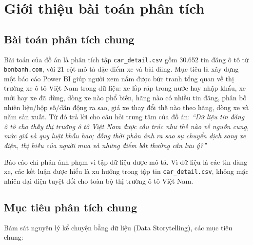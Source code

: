 \section{Giới thiệu bài toán phân tích}\label{sec:gioi-thieu}

\subsection{Bài toán phân tích chung}

Bài toán của đồ án là phân tích tập \texttt{car\_detail.csv} gồm 30.652 tin đăng ô tô từ \texttt{bonbanh.com}, với 21 cột mô tả đặc điểm xe và bài đăng. Mục tiêu là xây dựng một báo cáo Power BI giúp người xem nắm được bức tranh tổng quan về thị trường xe ô tô Việt Nam trong dữ liệu: xe lắp ráp trong nước hay nhập khẩu, xe mới hay xe đã dùng, dòng xe nào phổ biến, hãng nào có nhiều tin đăng, phân bố nhiên liệu/hộp số/dẫn động ra sao, giá xe thay đổi thế nào theo hãng, dòng xe và năm sản xuất. Từ đó trả lời cho câu hỏi trung tâm của đồ án: \textit{``Dữ liệu tin đăng ô tô cho thấy thị trường ô tô Việt Nam được cấu trúc như thế nào về nguồn cung, mức giá và quy luật khấu hao; đồng thời phản ánh ra sao sự chuyển dịch sang xe điện, thị hiếu của người mua và những điểm bất thường cần lưu ý?''}

Báo cáo chỉ phản ánh phạm vi tập dữ liệu được mô tả. Vì dữ liệu là các tin đăng xe, các kết luận được hiểu là xu hướng trong tập tin \texttt{car\_detail.csv}, không mặc nhiên đại diện tuyệt đối cho toàn bộ thị trường ô tô Việt Nam.

\subsection{Mục tiêu phân tích chung}

Bám sát nguyên lý kể chuyện bằng dữ liệu (Data Storytelling), các mục tiêu chung:

